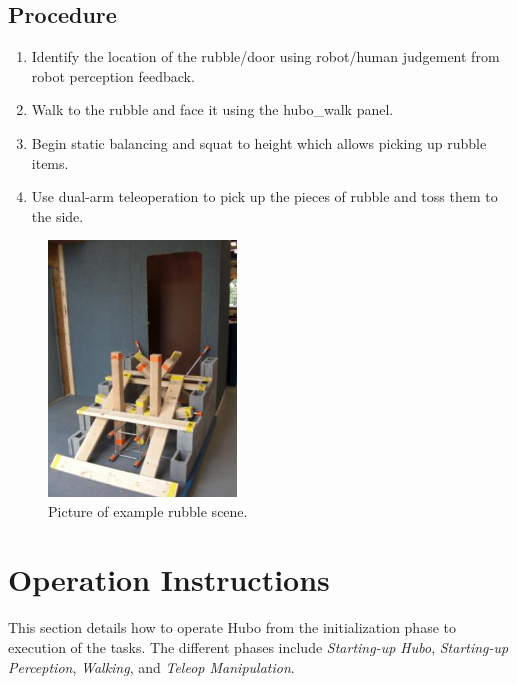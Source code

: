 \documentclass[letterpaper, 10 pt]{report}
\begin{document}
\subsection{Procedure}
\begin{enumerate}
\item Identify the location of the rubble/door using robot/human judgement from robot perception feedback.
\item Walk to the rubble and face it using the hubo\_walk panel.
\item Begin static balancing and squat to height which allows picking up rubble items.
\item Use dual-arm teleoperation to pick up the pieces of rubble and toss them to the side.
\end{enumerate}
\begin{figure}[ht]
  \centering
  \includegraphics[width=5.0cm]{figures/rubble-clearing}
  \caption{Picture of example rubble scene.}
  \label{fig:Rubble-image}
\end{figure}

\newpage

%
\section{Operation Instructions}\label{sec:operating-instructions}
This section details how to operate Hubo from the initialization phase to execution of the tasks. The different phases include \textit{Starting-up Hubo}, \textit{Starting-up Perception}, \textit{Walking}, and \textit{Teleop Manipulation}.
\end{document}
